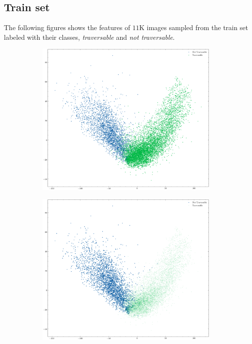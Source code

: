\documentclass[../document.tex]{subfiles}
\begin{document}
\subsection{Train set}
The following figures shows the features of $11$K images sampled from the train set labeled with their classes, \emph{traversable} and \emph{not traversable}. 
\begin{figure} [htbp]
    \centering
    \begin{subfigure}[b]{1\textwidth}
        \includegraphics[width=\linewidth]{../img/5/pca/pca.png}
    \end{subfigure}
    \begin{subfigure}[b]{0.48\textwidth}
        \includegraphics[width=\linewidth]{../img/5/pca/pca-0.png}

\end{subfigure}
\end{figure}
\end{document}
